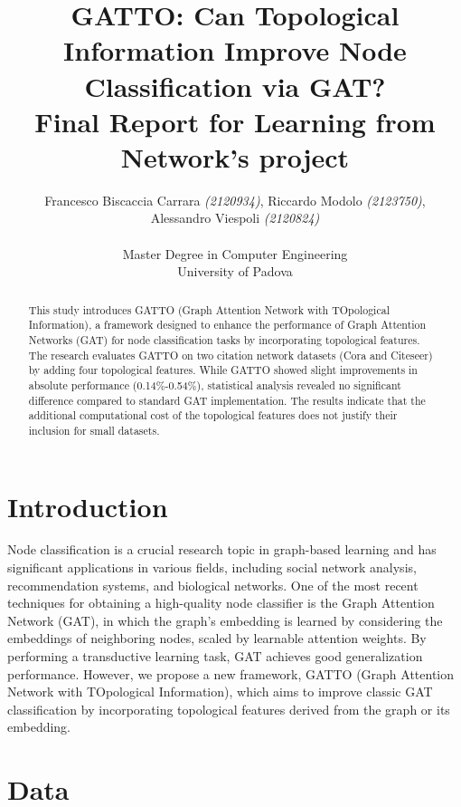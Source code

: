 \documentclass[12pt,conference]{ieeeconf} %
\title{GATTO: Can Topological Information Improve Node Classification via GAT?\\
\large Final Report for Learning from Network's project \\}
\author{Francesco Biscaccia Carrara \textit{(2120934)}, Riccardo Modolo \textit{(2123750)},\\ Alessandro Viespoli \textit{(2120824)} %
\\\\ Master Degree in Computer Engineering \\
University of Padova \\
}
\begin{document}
\maketitle
\thispagestyle{plain}
\pagestyle{plain}

\begin{abstract}
    This study introduces GATTO (Graph Attention Network with TOpological Information), a framework designed to enhance the performance of Graph Attention Networks (GAT) for node classification tasks by incorporating topological features. The research evaluates GATTO on two citation network datasets (Cora and Citeseer) by adding four topological features. While GATTO showed slight improvements in absolute performance (0.14\%-0.54\%), statistical analysis revealed no significant difference compared to standard GAT implementation. The results indicate that the additional computational cost of the topological features does not justify their inclusion for small datasets.
\end{abstract}


\section{Introduction} 
Node classification is a crucial research topic in graph-based learning and has significant applications in various fields, including social network analysis, recommendation systems, and biological networks. One of the most recent techniques for obtaining a high-quality node classifier is the Graph Attention Network (GAT), in which the graph's embedding is learned by considering the embeddings of neighboring nodes, scaled by learnable attention weights. By performing a transductive learning task, GAT achieves good generalization performance. However, we propose a new framework, GATTO (Graph Attention Network with TOpological Information), which aims to improve classic GAT classification by incorporating topological features derived from the graph or its embedding.

\section{Data} 
\end{document}
